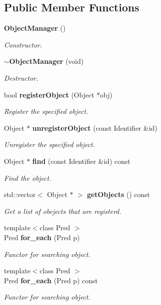 \subsection*{Public Member Functions}
\begin{DoxyCompactItemize}
\item 
{\bf ObjectManager} ()
\begin{DoxyCompactList}\small\item\em Constructor. \item\end{DoxyCompactList}\item 
{\bf $\sim$ObjectManager} (void)
\begin{DoxyCompactList}\small\item\em Destructor. \item\end{DoxyCompactList}\item 
bool {\bf registerObject} (Object $\ast$obj)
\begin{DoxyCompactList}\small\item\em Register the specified object. \item\end{DoxyCompactList}\item 
Object $\ast$ {\bf unregisterObject} (const Identifier \&id)
\begin{DoxyCompactList}\small\item\em Unregister the specified object. \item\end{DoxyCompactList}\item 
Object $\ast$ {\bf find} (const Identifier \&id) const 
\begin{DoxyCompactList}\small\item\em Find the object. \item\end{DoxyCompactList}\item 
std::vector$<$ Object $\ast$ $>$ {\bf getObjects} () const 
\begin{DoxyCompactList}\small\item\em Get a list of obejects that are registerd. \item\end{DoxyCompactList}\item 
{\footnotesize template$<$class Pred $>$ }\\Pred {\bf for\_\-each} (Pred p)
\begin{DoxyCompactList}\small\item\em Functor for searching object. \item\end{DoxyCompactList}\item 
{\footnotesize template$<$class Pred $>$ }\\Pred {\bf for\_\-each} (Pred p) const 
\begin{DoxyCompactList}\small\item\em Functor for searching object. \item\end{DoxyCompactList}\end{DoxyCompactItemize}
